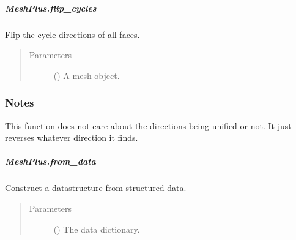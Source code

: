 \documentclass[letterpaper,10pt,english]{sphinxmanual}
\begin{document}
\begin{fulllineitems}
\begin{fulllineitems}
\end{fulllineitems}



\subparagraph{MeshPlus.flip\_cycles}
\label{\detokenize{api/generated/directional_clustering.mesh.MeshPlus.flip_cycles:meshplus-flip-cycles}}\label{\detokenize{api/generated/directional_clustering.mesh.MeshPlus.flip_cycles::doc}}

\begin{fulllineitems}
\label{\detokenize{api/generated/directional_clustering.mesh.MeshPlus.flip_cycles:directional_clustering.mesh.MeshPlus.flip_cycles}}
Flip the cycle directions of all faces.
\begin{quote}\begin{description}
\item[{Parameters}] \leavevmode
{} () \textendash{} A mesh object.

\end{description}\end{quote}
\subsubsection*{Notes}

This function does not care about the directions being unified or not. It
just reverses whatever direction it finds.

\end{fulllineitems}



\subparagraph{MeshPlus.from\_data}
\label{\detokenize{api/generated/directional_clustering.mesh.MeshPlus.from_data:meshplus-from-data}}\label{\detokenize{api/generated/directional_clustering.mesh.MeshPlus.from_data::doc}}

\begin{fulllineitems}
\label{\detokenize{api/generated/directional_clustering.mesh.MeshPlus.from_data:directional_clustering.mesh.MeshPlus.from_data}}
Construct a datastructure from structured data.
\begin{quote}\begin{description}
\item[{Parameters}] \leavevmode
{} () \textendash{} The data dictionary.


\end{description}
\end{quote}
\end{fulllineitems}
\end{fulllineitems}
\end{document}
